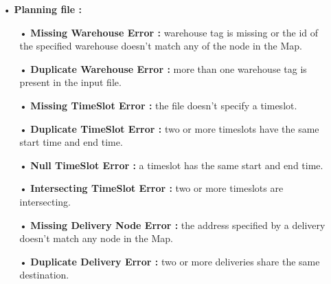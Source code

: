 \documentclass[paper=a4, fontsize=11pt]{report}
\numberwithin{equation}{section}		%
\numberwithin{figure}{section}		%
\numberwithin{table}{section}		%
\begin{document}
\begin{itemize}
\begin{itemize}
    \item[•] \textbf{Planning file :}
    \begin{itemize}
      \item[•] \textbf{Missing Warehouse Error :} warehouse tag is missing or the id of the specified warehouse doesn’t match any of the node in the Map.
      \item[•] \textbf{Duplicate Warehouse Error :} more than one warehouse tag is present in the input file.
      \item[•] \textbf{Missing TimeSlot Error :} the file doesn’t specify a timeslot.
      \item[•] \textbf{Duplicate TimeSlot Error :} two or more timeslots have the same start time and end time.
      \item[•] \textbf{Null TimeSlot Error :} a timeslot has the same start and end time.
      \item[•] \textbf{Intersecting TimeSlot Error :} two or more timeslots are intersecting.
      \item[•] \textbf{Missing Delivery Node Error :} the address specified by a delivery doesn’t match any node in the Map.
      \item[•] \textbf{Duplicate Delivery Error :} two or more deliveries share the same destination. 
    \end{itemize}
  \end{itemize}
\end{itemize}

\end{document}
